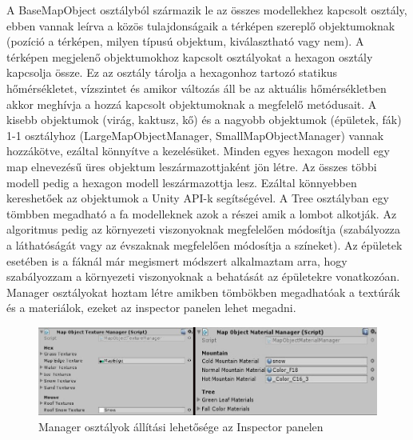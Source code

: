 A BaseMapObject osztályból származik le az összes modellekhez kapcsolt osztály, ebben vannak leírva a közös tulajdonságaik a térképen szereplő objektumoknak (pozíció a térképen, milyen típusú objektum, kiválasztható vagy nem). A térképen megjelenő objektumokhoz kapcsolt osztályokat a hexagon osztály kapcsolja össze. Ez az osztály tárolja  a hexagonhoz tartozó statikus hőmérsékletet, vízszintet és amikor változás áll be az aktuális hőmérsékletben akkor meghívja a hozzá kapcsolt objektumoknak a megfelelő metódusait. A kisebb objektumok (virág, kaktusz, kő) és a nagyobb objektumok (épületek, fák) 1-1 osztályhoz (LargeMapObjectManager, SmallMapObjectManager) vannak hozzákötve, ezáltal könnyítve a kezelésüket.
\newline
\newline Minden egyes hexagon modell egy map elnevezésű üres objektum leszármazottjaként jön létre. Az összes többi modell pedig a hexagon modell leszármazottja lesz. Ezáltal könnyebben kereshetőek az objektumok a Unity API-k segítségével.
\newline
\newline A Tree osztályban egy tömbben megadható a fa modelleknek azok a részei amik a lombot alkotják. Az algoritmus pedig az környezeti viszonyoknak megfelelően módosítja (szabályozza a láthatóságát vagy az évszaknak megfelelően módosítja a színeket).
\newline
\newline Az épületek esetében is a fáknál már megismert módszert alkalmaztam arra, hogy szabályozzam a környezeti viszonyoknak a behatását az épületekre vonatkozóan.
\newline
\newline Manager osztályokat hoztam létre amikben tömbökben megadhatóak a textúrák és a materiálok, ezeket az inspector panelen lehet megadni.

\begin{figure}[h!]
\centering
\includegraphics[scale=0.6]{kepek/Managers.jpg}
\caption{Manager osztályok állítási lehetősége az Inspector panelen}
\label{fig:Managers}
\end{figure}

\newpage
